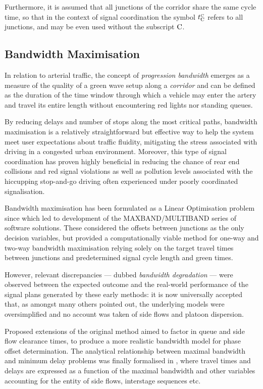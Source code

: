 Furthermore, it is assumed that all junctions of the corridor share the same cycle time, so that in the context of signal coordination the symbol $t_{\mathrm{C}}^{\scriptscriptstyle{C}}$ refers to all junctions, and may be even used without the subscript $\mathrm{C}$.


\subsection{Bandwidth Maximisation} \label{s:bandmax}
In relation to arterial traffic, the concept of \emph{progression bandwidth} emerges as a measure of the quality of a green wave setup along a \emph{corridor} and can be defined as the duration of the time window through which a vehicle may enter the artery and travel its entire length without encountering red lights nor standing queues.

By reducing delays and number of stops along the most critical paths, bandwidth maximisation is a relatively straightforward but effective way to help the system meet user expectations about traffic fluidity, mitigating the stress associated with driving in a congested urban environment. Moreover, this type of signal coordination has proven highly beneficial in reducing the chance of rear end collisions and red signal violations \citep{li2010safety} as well as pollution levels associated with the hiccupping stop-and-go driving often experienced under poorly coordinated signalisation.

Bandwidth maximisation has been formulated as a Linear Optimisation problem since \citep{little1981maxband} which led to development of the MAXBAND/MULTIBAND series of software solutions. These considered the offsets between junctions as the only decision variables, but provided a computationally viable method for one-way and two-way bandwidth maximisation relying solely on the target travel times between junctions and predetermined signal cycle length and green times.

However, relevant discrepancies — dubbed \emph{bandwidth degradation} — were observed between the expected outcome and the real-world performance of the signal plans generated by these early methods: it is now universally accepted that, as \citep{tsay1988new} amongst many others pointed out, the underlying models were oversimplified and no account was taken of side flows and platoon dispersion. 

Proposed extensions of the original method aimed to factor in queue and side flow clearance times, to produce a more realistic bandwidth model for phase offset determination. The analytical relationship between maximal bandwidth and minimum delay problems was finally formalised in \citep{papola2000new}, where travel times and delays are expressed as a function of the maximal bandwidth and other variables accounting for the entity of side flows, interstage sequences etc.

